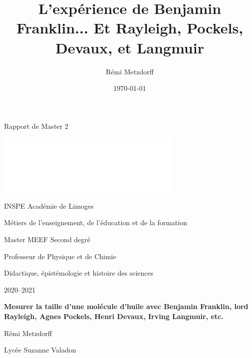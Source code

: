 \documentclass[12pt,a4paper]{article}
\title{L'expérience de Benjamin Franklin... Et Rayleigh, Pockels, Devaux, et Langmuir}
\author{Rémi Metzdorff}
\date{\today}
\newenvironment{header}
{%
	\addcontentsline{ldf}{figure}{0}%
	\begin{header_env}\qquad\Large\bf}
	{\end{header_env}}
\begin{document}

\begin{header}
\begin{minipage}{0.55\textwidth}
Rapport de Master 2
\end{minipage}
\begin{minipage}{0.38\textwidth}
\href{https://www.unilim.fr/}{\includegraphics[scale=1]{logo.png}}
\end{minipage}
\end{header}

\vspace{30pt}
\begin{spacing}{1.2}
{\bf
\begin{Large}
\noindent
\textcolor{gray_unilim}{INSPE Académie de Limoges}
\end{Large}

\begin{large}
\noindent
\textcolor{gray_unilim}{Métiers de l'enseignement, de l'éducation et de la formation}

\noindent
\textcolor{gray_unilim}{Master MEEF Second degré}

\noindent
\textcolor{gray_unilim}{Professeur de Physique et de Chimie}

\noindent
\textcolor{gray_unilim}{Didactique, épistémologie et histoire des sciences}

\end{large}
}

\vspace{20pt}

\noindent
\textcolor{gray_unilim}{2020--2021}

\vspace{40pt}
\begin{large}
\bf
\noindent
\textcolor{gray_unilim}{Mesurer la taille d'une molécule d'huile avec Benjamin Franklin, lord Rayleigh, Agnes Pockels,  Henri Devaux, Irving Langmuir, etc.}

\vspace{150pt}
\noindent
\textcolor{gray_unilim}{Rémi Metzdorff}

\noindent
\textcolor{gray_unilim}{Lycée Suzanne Valadon}
\end{large}
\end{spacing}
\end{document}
